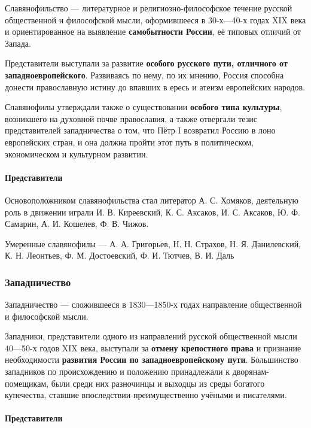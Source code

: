 \documentclass{article}
\begin{document}
\begin{flushleft}

Славянофильство — литературное и религиозно-философское течение русской общественной и философской мысли, оформившееся в 30-х—40-х годах XIX века и ориентированное на выявление \textbf{самобытности России}, её типовых отличий от Запада.

Представители выступали за развитие \textbf{особого русского пути, отличного от западноевропейского}. Развиваясь по нему, по их мнению, Россия способна донести православную истину до впавших в ересь и атеизм европейских народов.

Славянофилы утверждали также о существовании \textbf{особого типа культуры}, возникшего на духовной почве православия, а также отвергали тезис представителей западничества о том, что Пётр I возвратил Россию в лоно европейских стран, и она должна пройти этот путь в политическом, экономическом и культурном развитии.

\paragraph{Представители} Основоположником славянофильства стал литератор А. С. Хомяков, деятельную роль в движении играли И. В. Киреевский, К. С. Аксаков, И. С. Аксаков, Ю. Ф. Самарин, А. И. Кошелев, Ф. В. Чижов.

Умеренные славянофилы — А. А. Григорьев, Н. Н. Страхов, Н. Я. Данилевский, К. Н. Леонтьев, Ф. М. Достоевский, Ф. И. Тютчев, В. И. Даль

\subsubsection{Западничество}

Западничество — сложившееся в 1830—1850-х годах направление общественной и философской мысли.

Западники, представители одного из направлений русской общественной мысли 40—50-х годов XIX века, выступали за \textbf{отмену крепостного права} и признание необходимости \textbf{развития России по западноевропейскому пути}. Большинство западников по происхождению и положению принадлежали к дворянам-помещикам, были среди них разночинцы и выходцы из среды богатого купечества, ставшие впоследствии преимущественно учёными и писателями.

\paragraph{Представители}


\end{flushleft}
\end{document}
